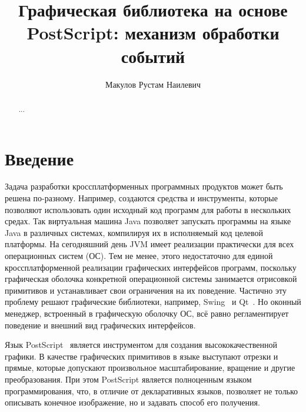 \title{Графическая библиотека на основе PostScript: механизм обработки событий}


\author{Макулов Рустам Наилевич}



\maketitle             

\begin{abstract}
...
\end{abstract}

\section*{Введение}
Задача разработки кроссплатформенных программных продуктов может быть решена по-разному. Например, создаются средства и инструменты, которые позволяют использовать один исходный код программ для работы в нескольких средах. Так виртуальная машина Java позволяет запускать программы на языке Java в различных системах, компилируя их в исполняемый код целевой платформы. На сегодняшний день JVM имеет реализации практически для всех операционных систем (ОС). Тем не менее, этого недостаточно для единой кроссплатформенной реализации графических интерфейсов программ, поскольку графическая оболочка конкретной операционной системы занимается отрисовкой примитивов и устанавливает свои ограничения на их поведение. Частично эту проблему решают графические библиотеки, например, Swing~\cite{wiki:swing} и Qt~\cite{wiki:qt}. Но оконный менеджер, встроенный в графическую оболочку ОС, всё равно регламентирует поведение и внешний вид графических интерфейсов.

Язык PostScript~\cite{wiki:plrm} является инструментом для создания высококачественной графики. В качестве графических примитивов в языке выступают отрезки и прямые, которые допускают произвольное масштабирование, вращение и другие преобразования. При этом PostScript является полноценным языком программирования, что, в отличие от декларативных языков, позволяет не только описывать конечное изображение, но и задавать способ его получения.

